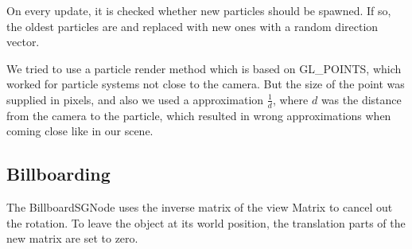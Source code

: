On every update, it is checked whether new particles should be spawned.
If so, the oldest particles are  and replaced with new ones with a random direction vector.

We tried to use a particle render method which is based on GL\_POINTS,
which worked for particle systems not close to the camera.
But the size of the point was supplied in pixels, and also we used a approximation $\frac{1}{d}$, where $d$ was the distance
from the camera to the particle, which resulted in wrong approximations when coming close like in our scene.



\subsection{Billboarding} \label{sec:billboarding}
The BillboardSGNode uses  the inverse matrix of the view Matrix to cancel out the rotation.
To leave the object at its world position, the translation parts  of the new matrix are set to zero.